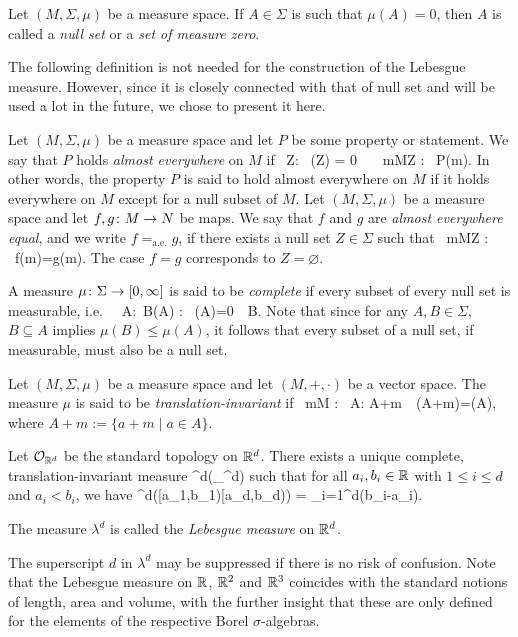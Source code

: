\bd
Let $(M,\Sigma,\mu)$ be a measure space. If $A\in\Sigma$ is such that $\mu(A)=0$, then $A$ is called a \emph{null set} or a \emph{set of measure zero}. 
\ed

The following definition is not needed for the construction of the Lebesgue measure. However, since it is closely connected with that of null set and will be used a lot in the future, we chose to present it here.

\bd
Let $(M,\Sigma,\mu)$ be a measure space and let $P$ be some property or statement. We say that $P$ holds \emph{almost everywhere} on $M$ if
\bse
\exists \, Z\in \Sigma : \ \mu(Z) = 0 \,  \, \forall \, m\in M\setminus Z : \, P(m).
\ese
\ed
In other words, the property $P$ is said to hold almost everywhere on $M$ if it holds everywhere on $M$ except for a null subset of $M$.
\be
Let $(M,\Sigma,\mu)$ be a measure space and let $f,g\colon M\to N$ be maps. We say that $f$ and $g$ are \emph{almost everywhere equal}, and we write $f=_{\mathrm{a.e.}}g$, if there exists a null set $Z\in \Sigma$ such that
\bse
\forall \, m\in M\setminus Z : \ f(m)=g(m).
\ese
The case $f=g$ corresponds to $Z=\varnothing$.
\ee

\bd
A measure $\mu\colon \Sigma\to [0,\infty]$ is said to be \emph{complete} if every subset of every null set is measurable, i.e.\
\bse
\forall \, A\in \Sigma :\forall \, B\in{}(A) : \ \mu(A)=0 \,\Rightarrow \, B\in\Sigma.
\ese
\ed
Note that since for any $A,B\in\Sigma$, $B\subseteq A$ implies $\mu(B)\leq\mu(A)$, it follows that every subset of a null set, if measurable, must also be a null set.

\bd
Let $(M,\Sigma,\mu)$ be a measure space and let $(M,+,\cdot)$ be a vector space. The measure $\mu$ is said to be \emph{translation-invariant} if
\bse
\forall \, m\in M : \forall \, A\in \Sigma : \quad A+m\in\Sigma\ \ \mu(A+m)=\mu(A),
\ese
where $A+m := \{a+m\mid a\in A\}$.
\ed

\bt
Let $\mathcal{O}_{\mathbb{R}^d}$ be the standard topology on $\mathbb{R}^d$. There exists a unique complete, translation-invariant measure 
\bse
\lambda^d\cl\sigma(_{\R^d})\to[0,\infty]
\ese
such that for all $a_i,b_i\in\mathbb{R}$ with $1\leq i\leq d$ and $a_i<b_i$, we have
\bse
\lambda^d\bigl([a_1,b_1)\times\cdots\times[a_d,b_d)\bigr) = \prod_{i=1}^d(b_i-a_i).
\ese
\et

\bd
The measure $\lambda^d$ is called the \emph{Lebesgue measure} on $\mathbb{R}^d$.
\ed

The superscript $d$ in $\lambda^d$ may be suppressed if there is no risk of confusion. Note that the Lebesgue measure on $\mathbb{R}$, $\mathbb{R}^2$ and $\mathbb{R}^3$ coincides with the standard notions of length, area and volume, with the further insight that these are only defined for the elements of the respective Borel $\sigma$-algebras.

